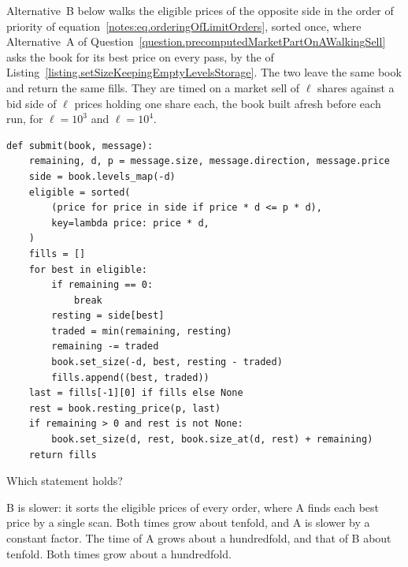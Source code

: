 \begin{question}
\label{question.sweepRescanningTheBestPrice}
Alternative~B below walks the eligible prices of the opposite side
in the order of priority of equation~\eqref{notes:eq.orderingOfLimitOrders},
sorted once,
where Alternative~A of Question~\ref{question.precomputedMarketPartOnAWalkingSell}
asks the book for its best price on every pass,
by the  of Listing~\ref{listing.setSizeKeepingEmptyLevelsStorage}.
The two leave the same book and return the same fills.
They are timed on a market sell of $\ell$ shares
against a bid side of $\ell$ prices holding one share each,
the book built afresh before each run,
for $\ell = 10^{3}$ and $\ell = 10^{4}$.
\begin{lstlisting}[caption={Alternative B}, label=listing.sweepRescanningTheBestPriceB]
def submit(book, message):
    remaining, d, p = message.size, message.direction, message.price
    side = book.levels_map(-d)
    eligible = sorted(
        (price for price in side if price * d <= p * d),
        key=lambda price: price * d,
    )
    fills = []
    for best in eligible:
        if remaining == 0:
            break
        resting = side[best]
        traded = min(remaining, resting)
        remaining -= traded
        book.set_size(-d, best, resting - traded)
        fills.append((best, traded))
    last = fills[-1][0] if fills else None
    rest = book.resting_price(p, last)
    if remaining > 0 and rest is not None:
        book.set_size(d, rest, book.size_at(d, rest) + remaining)
    return fills
\end{lstlisting}
Which statement holds?
\begin{choices}
 \choice B is slower: it sorts the eligible prices of every order,
  where A finds each best price by a single scan.
 \choice Both times grow about tenfold, and A is slower by a constant factor.
 \correctchoice The time of A grows about a hundredfold, and that of B about tenfold.
 \choice Both times grow about a hundredfold.
\end{choices}
\end{question}

